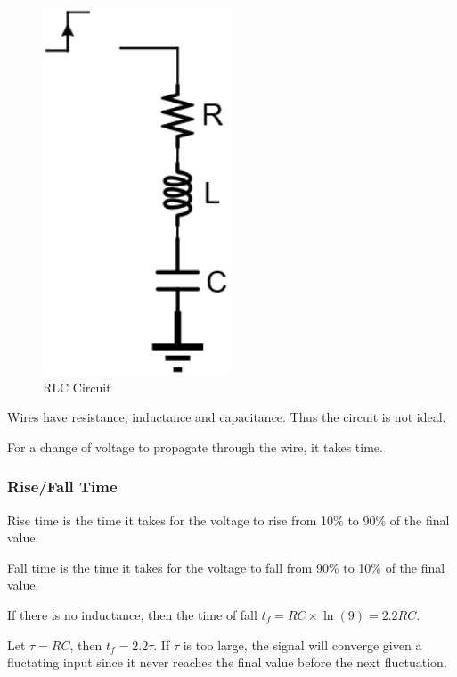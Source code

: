 \begin{figure}
    \centering
    \includegraphics[scale=0.5]{images/RLC.png}
    \caption{RLC Circuit}
\end{figure}

Wires have resistance, inductance and capacitance. Thus the circuit is not ideal. 

For a change of voltage to propagate through the wire, it takes time.

\subsubsection{Rise/Fall Time}

Rise time is the time it takes for the voltage to rise from 10\% to 90\% of the final value.

Fall time is the time it takes for the voltage to fall from 90\% to 10\% of the final value.

If there is no inductance, then the time of fall $t_f = RC \times \ln(9) = 2.2RC$.

Let $\tau = RC$, then $t_f = 2.2\tau$. If $\tau$ is too large, the signal will converge given a fluctating input since it never reaches the final value before the next fluctuation.